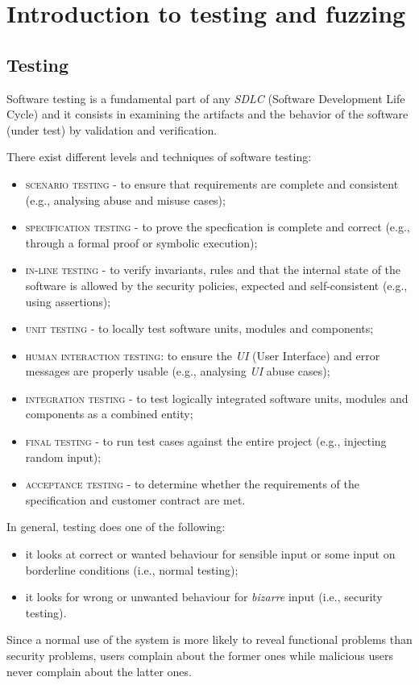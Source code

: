 \section{Introduction to testing and fuzzing}
\label{sec:intro}

\subsection{Testing}
Software testing is a fundamental part of any \textit{SDLC} (Software Development Life Cycle) and it consists in examining the artifacts and the behavior of the software (under test) by validation and verification.

There exist different levels and techniques of software testing:
\begin{itemize}[itemsep=1pt]
    \item \textsc{scenario testing} - to ensure that requirements are complete and consistent (e.g., analysing abuse and misuse cases);
    \item \textsc{specification testing} - to prove the specfication is complete and correct (e.g., through a formal proof or symbolic execution);
    \item \textsc{in-line testing} - to verify invariants, rules and that the internal state of the software is allowed by the security policies, expected and self-consistent (e.g., using assertions);
    \item \textsc{unit testing} - to locally test software units, modules and components;
    \item \textsc{human interaction testing}: to ensure the \textit{UI} (User Interface) and error messages are properly usable (e.g., analysing \textit{UI} abuse cases);
    \item \textsc{integration testing} - to test logically integrated software units, modules and components as a combined entity;
    \item \textsc{final testing} - to run test cases against the entire project (e.g., injecting random input);
    \item \textsc{acceptance testing} - to determine whether the requirements of the specification and customer contract are met.
\end{itemize}

In general, testing does one of the following:
\begin{itemize}[itemsep=1pt]
    \item it looks at correct or wanted behaviour for sensible input or some input on borderline conditions (i.e., normal testing);
    \item it looks for wrong or unwanted behaviour for \textit{bizarre} input (i.e., security testing).
\end{itemize}
Since a normal use of the system is more likely to reveal functional problems than security problems, users complain about the former ones while malicious users never complain about the latter ones.

